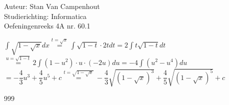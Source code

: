 \documentclass[a4paper]{article}
\begin{document}
  
\noindent \large Auteur: Stan Van Campenhout \\
\noindent \large Studierichting:  Informatica\\
\noindent \large Oefeningenreeks 4A nr. 60.1\\

\medskip

\normalsize

$ \displaystyle\int\sqrt{1-\sqrt{x}}dx \stackrel{t = \sqrt{x}}{=} \displaystyle\int\sqrt{1-t}\cdot2tdt = 2\displaystyle\int t\sqrt{1-t}dt $\\

$ \stackrel{u = \sqrt{1-t}}{=} 2\displaystyle\int\left(1-u^2\right)\cdot u\cdot\left(-2u\right)du = -4\displaystyle\int\left(u^2-u^4\right)du $\\

$ = -\dfrac{4}{3}u^3+\dfrac{4}{5}u^5+c \stackrel{t = \sqrt{1-\sqrt{x}}}{=}  -\dfrac{4}{3} \sqrt{\left(1-\sqrt{x}\right)^3}+\dfrac{4}{5} \sqrt{\left(1-\sqrt{x}\right)^5}+c $\\

\begin{thebibliography}{999}
\end{thebibliography}
\end{document}
